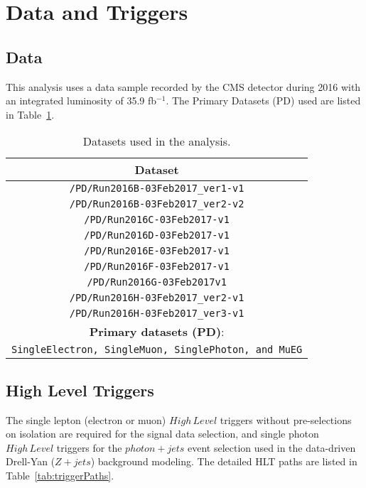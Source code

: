 \section{Data and Triggers}
\subsection{Data}
This analysis uses a data sample recorded by the CMS detector during 2016 with an integrated luminosity of 35.9 fb$^{-1}$. The Primary Datasets (PD) used are listed in Table~\ref{tab:samples_data}. 
\begin{table}[htbp]
  \begin{center}
    \caption{Datasets used in the analysis. \label{tab:samples_data}}
    \begin{tabular}{c}
      \hline\hline
      Dataset   \\
      \hline
      \texttt{/PD/Run2016B-03Feb2017\_ver1-v1} \\ 
      \texttt{/PD/Run2016B-03Feb2017\_ver2-v2}  \\
      \texttt{/PD/Run2016C-03Feb2017-v1}  \\
      \texttt{/PD/Run2016D-03Feb2017-v1}  \\
      \texttt{/PD/Run2016E-03Feb2017-v1}  \\
      \texttt{/PD/Run2016F-03Feb2017-v1}  \\
      \texttt{/PD/Run2016G-03Feb2017v1}  \\
      \texttt{/PD/Run2016H-03Feb2017\_ver2-v1}  \\
      \texttt{/PD/Run2016H-03Feb2017\_ver3-v1}  \\
      \hline
      \textbf{Primary datasets (PD)}: \\
      \texttt{SingleElectron, SingleMuon, SinglePhoton, and MuEG}\\ \hline
      \hline\hline
    \end{tabular}
  \end{center}
\end{table}

\subsection{High Level Triggers}
The single lepton (electron or muon) $High\,Level$ triggers without pre-selections on isolation are required for the signal data selection, and single photon $High\,Level$ triggers for the $photon+jets$ event selection used in the data-driven Drell-Yan ($Z+jets$) background modeling. The detailed HLT paths are listed in Table~\ref{tab:triggerPaths}. 

